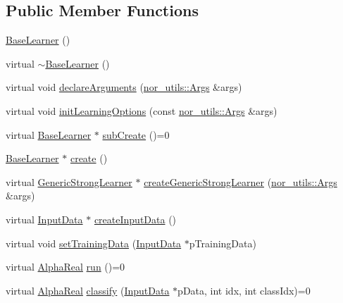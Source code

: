 \subsection*{Public Member Functions}
\begin{DoxyCompactItemize}
\item 
\hyperlink{classMultiBoost_1_1BaseLearner_aef4aefaa9e4bb02983788855594ac30b}{BaseLearner} ()
\item 
virtual \hyperlink{classMultiBoost_1_1BaseLearner_ab9cf682032357c987f3485063c7eda34}{$\sim$BaseLearner} ()
\item 
virtual void \hyperlink{classMultiBoost_1_1BaseLearner_ab67f4944b1967c7141982b5d47720620}{declareArguments} (\hyperlink{classnor__utils_1_1Args}{nor\_\-utils::Args} \&args)
\item 
virtual void \hyperlink{classMultiBoost_1_1BaseLearner_ad124cba3e0d39493bb731fe362a38e2a}{initLearningOptions} (const \hyperlink{classnor__utils_1_1Args}{nor\_\-utils::Args} \&args)
\item 
virtual \hyperlink{classMultiBoost_1_1BaseLearner}{BaseLearner} $\ast$ \hyperlink{classMultiBoost_1_1BaseLearner_a2a00bc0e8f9ebe1f9db596e466b56e3f}{subCreate} ()=0
\item 
\hyperlink{classMultiBoost_1_1BaseLearner}{BaseLearner} $\ast$ \hyperlink{classMultiBoost_1_1BaseLearner_a37a031dd966926005056e177e4070c5f}{create} ()
\item 
virtual \hyperlink{classMultiBoost_1_1GenericStrongLearner}{GenericStrongLearner} $\ast$ \hyperlink{classMultiBoost_1_1BaseLearner_a80735a2e6adfc75e52bad70a0072d890}{createGenericStrongLearner} (\hyperlink{classnor__utils_1_1Args}{nor\_\-utils::Args} \&args)
\item 
virtual \hyperlink{classMultiBoost_1_1InputData}{InputData} $\ast$ \hyperlink{classMultiBoost_1_1BaseLearner_aa6bce26112ef2ce1275385d06467a9a9}{createInputData} ()
\item 
virtual void \hyperlink{classMultiBoost_1_1BaseLearner_a3392a509caed2678e948b19446e0d73a}{setTrainingData} (\hyperlink{classMultiBoost_1_1InputData}{InputData} $\ast$pTrainingData)
\item 
virtual \hyperlink{Defaults_8h_a80184c4fd10ab70a1a17c5f97dcd1563}{AlphaReal} \hyperlink{classMultiBoost_1_1BaseLearner_a525e8f10782055b5c9762318e6e9768e}{run} ()=0
\item 
virtual \hyperlink{Defaults_8h_a80184c4fd10ab70a1a17c5f97dcd1563}{AlphaReal} \hyperlink{classMultiBoost_1_1BaseLearner_af8bccd75a88d572a24ea337abcaa00f0}{classify} (\hyperlink{classMultiBoost_1_1InputData}{InputData} $\ast$pData, int idx, int classIdx)=0

\end{DoxyCompactItemize}
